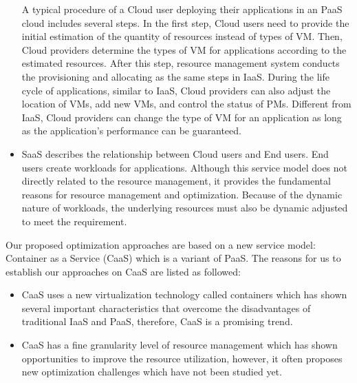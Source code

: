 \begin{itemize}
 	A typical procedure of a Cloud user deploying their applications in an PaaS cloud includes several steps.
 	In the first step, Cloud users need to provide the initial estimation of the quantity of resources instead of types of VM. Then, Cloud providers determine the types of VM for applications according to the estimated resources.  After this step, resource management system conducts the provisioning and allocating as the same steps in IaaS. During the life cycle of applications, similar to IaaS, Cloud providers can also adjust the location of VMs, add new VMs, and control the status of PMs. Different from IaaS, Cloud providers can change the type of VM for an application as long as the application's performance can be guaranteed.


 	\item SaaS describes the relationship between Cloud users and End users. End users create workloads for applications. Although this service model does not directly related to the resource management, it provides the fundamental reasons for resource management and optimization. Because of the dynamic nature of workloads, the underlying resources must also be dynamic adjusted to meet the requirement.
\end{itemize}


Our proposed optimization approaches are based on a new service model: Container as a Service (CaaS) \cite{Piraghaj:2016bw} which is a variant of PaaS. The reasons for us to establish our approaches on CaaS are listed as followed:
\begin{itemize}
	\item CaaS uses a new virtualization technology called containers which has shown several important characteristics that overcome the disadvantages of traditional IaaS and PaaS, therefore, CaaS is a promising trend.
	\item CaaS has a fine granularity level of resource management which has shown opportunities to improve the resource utilization, however, it often proposes new optimization challenges which have not been studied yet.
\end{itemize}

